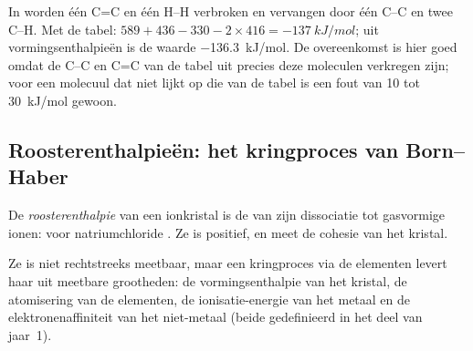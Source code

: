 \begin{example}\label{ex:b2:reaction-enthalpy:hydrogenation}
In  worden één C=C en één H--H verbroken en
vervangen door één C--C en twee C--H. Met de tabel: $589 + 436 - 330 - 2
\times 416 = \qty{-137}{kJ/mol}$; uit vormingsenthalpieën is de waarde
\qty{-136.3}{kJ/mol}. De overeenkomst is hier goed omdat de C--C en C=C van de tabel
uit precies deze moleculen verkregen zijn; voor een molecuul dat niet lijkt op
die van de tabel is een fout van 10 tot \qty{30}{kJ/mol} gewoon.
\end{example}

\subsection*{Roosterenthalpieën: het kringproces van Born--Haber}

\begin{definition}[Roosterenthalpie]\label{def:b2:reaction-enthalpy:lattice-enthalpy}
De \emph{roosterenthalpie} van een ionkristal is
de  van zijn dissociatie tot gasvormige ionen: voor
natriumchloride . Ze is positief, en
meet de cohesie van het kristal.
\end{definition}

Ze is niet rechtstreeks meetbaar, maar een kringproces via de elementen levert haar
uit meetbare grootheden: de vormingsenthalpie van het kristal, de
atomisering van de elementen, de ionisatie-energie van het metaal en de
elektronenaffiniteit van het niet-metaal (beide gedefinieerd in het deel van jaar~1).

